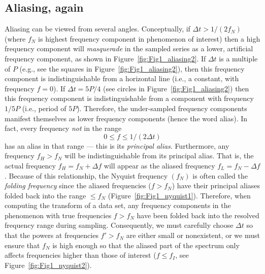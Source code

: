 \subsection{Aliasing, again}
Aliasing can be viewed from several angles.  Conceptually, if $\Delta t > 1/(2 f_N)$  (where $f_N$ is 
highest frequency component in phenomenon of interest) then a high frequency component will \emph{masquerade} in the 
sampled series as a lower, artificial frequency component, as shown in Figure~\ref{fig:Fig1_aliasing2}.
\noindent
If $\Delta t$ is a multiple of $P$ (e.g., see the squares in Figure~\ref{fig:Fig1_aliasing2}), then this frequency component is indistinguishable from a 
horizontal line (i.e., a constant, with frequency $f = 0$).  If  $\Delta t = 5 P/4$ (see circles in Figure~\ref{fig:Fig1_aliasing2}) then this frequency 
component is indistinguishable from a component with frequency $1/5 P$ (i.e., period of $5P$).  Therefore, the 
under-sampled frequency components manifest themselves as lower frequency components 
(hence the word alias).  In fact, every frequency \emph{not} in the range
\begin{equation}
0 \leq f \leq 1/(2\Delta t)
\end{equation}
has an alias in that range --- this is its \emph{principal alias}.  Furthermore, any frequency $f_H > f_N$ 
will be indistinguishable from its principal alias.  That is, the actual frequency $f_H = f_N + \Delta f$ will appear as the aliased frequency $f_L = f_N - \Delta f$.
	Because of this relationship, the Nyquist frequency $(f_N)$ is often called the \emph{folding frequency} since the
aliased frequencies ($f > f_N$) have their principal aliases folded back into the range $\leq f_N$ (Figure~\ref{fig:Fig1_nyquist1}).
Therefore, when computing the transform of a data set,
any frequency components in the phenomenon with true frequencies $f > f_N$ have been folded back into 
the resolved frequency range during sampling.  Consequently, we must carefully choose $\Delta t$ so that the powers at frequencies $f' > f_N$ are either small 
or nonexistent, or we must ensure that $f_N$ is high enough so that the aliased part of the spectrum only affects 
frequencies higher than those of interest ($f \leq f_I$, see Figure~\ref{fig:Fig1_nyquist2}).

